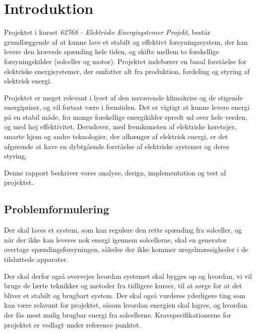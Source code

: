 \documentclass[../main.tex]{subfiles}
\begin{document}
\chapter{Introduktion}
Projektet i kurset \emph{62768 - Elektriske Energisystemer Projekt}, består grundlæggende af at kunne lave et stabilt og effektivt forsyningssystem, der kan levere den krævede spænding hele tiden, og skifte mellem to forskellige forsyningskilder (solceller og motor).  Projektet indebærer en basal forståelse for elektriske energisystemer, der omfatter alt fra produktion, fordeling og styring af elektrisk energi. 

Projektet er meget relevant i lyset af den nuværende klimakrise og de stigende energipriser, og vil fortsat være i fremtiden. Det er vigtigt at kunne levere energi på en stabil måde, fra mange forskellige energikilder spredt ud over hele verden, og med høj effektivitet. Derudover, med fremkomsten af elektriske køretøjer, smarte hjem og andre teknologier, der afhænger af elektrisk energi, er det afgørende at have en dybtgående forståelse af elektriske systemer og deres styring.

Denne rapport beskriver vores analyse, design, implementation og test af projektet.

\section{Problemformulering}
Der skal laves et system, som kan regulere den rette spænding fra solceller, og når der ikke kan leveres nok energi igennem solcellerne, skal en generator overtage spændingsforsyningen, således der ikke kommer uregelmæssigheder i de tilsluttede apparater. 

Der skal derfor også overvejes hvordan systemet skal bygges op og hvordan, vi vil bruge de lærte teknikker og metoder fra tidligere kurser, til at sørge for at det bliver et stabilt og brugbart system. Der skal også vurderes yderligere ting som kan være relavant for projektet, såsom hvordan energien skal lagres, og hvordan der fås mest mulig brugbar energi fra solcellerne. Kravspecifikationerne for projektet er vedlagt under reference punktet.
\newpage
\end{document}
